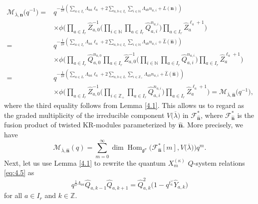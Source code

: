 \documentclass[10pt,a4paper]{amsart}
\numberwithin{equation}{section}
\DeclareMathOperator{\Hom}{Hom}
\begin{document}
\begin{align*}
\mathcal{M}_{\overline{\lambda},\mathbf{n}}\bigl(q^{-1}\bigr)
={}&q^{-\frac{1}{2\delta}(\sum_{a\in I_r}\Lambda_{aa}\ell_a+2\sum_{a,b\in I_r}\sum_{i\in\mathbb{N}}\Lambda_{ab}n_{a,i}+L( \mathbf{n}))}\\
&\times\phi\biggl(\prod_{a\in I_r}\widehat{Z}_{ a,0} ^{-1}\biggl(\prod_{i\in\mathbb{N}}\prod_{a\in I_r}\widehat{Q}_{ a,i}^{n_{a,i}}\biggr)\prod_{a\in I_r}\widehat{Z}_a^{\ell_a+1}\biggr)\\
={}&q^{-\frac{1}{2\delta}(\sum_{a\in I_r}\Lambda_{aa}\ell_a+2\sum_{a,b\in I_r}\sum_{i\in\mathbb{N}}\Lambda_{ab}n_{a,i}+\widehat{L}(\widehat{\mathbf{n}}))}\\
&\times\phi\biggl(\prod_{a\in I_r}\widehat{Q}_{a,0}^{n_{a,0}}\prod_{a\in I_r}\widehat{Z}_{ a,0} ^{-1}\biggl(\prod_{i\in\mathbb{N}}\prod_{a\in I_r} \widehat{Q}_{a,i}^{n_{a,i}}\biggr)\prod_{a\in I_r}\widehat{ Z}_a^{\ell_a+1}\biggr)\\
={}&q^{-\frac{1}{2\delta}(\sum_{a\in I_r}\Lambda_{aa}\ell_a+2\sum_{a,b\in I_r}\sum_{i\in\mathbb{Z}_+}\Lambda_{ab}n_{a,i}+\widehat{L}(\widehat{\mathbf{n}}))}\\
&\times\phi\biggl(\prod_{a\in I_r}\widehat{Z}_{a,0}^{-1}\biggl(\prod_{i\in\mathbb{Z}_+}\prod_{a\in I_r} \widehat{Q}_{a,i}^{n_{a,i}}\biggr)\prod_{a\in I_r}\widehat{ Z}_a^{\ell_a+1}\biggr)
=\mathcal{M}_{\overline{\lambda},\widehat{\mathbf{n}}}\bigl(q^{-1}\bigr),
\end{align*}
where the third equality follows from Lemma \ref{4.1}. This allows us to regard  as the graded multiplicity of the irreducible component $V\bigl(\overline{\lambda}\bigr)$ in $\mathcal{F}_{\widehat{\mathbf{n}}}^*$, where $\mathcal{F}_{\widehat{\mathbf{n}}}^*$ is the fusion product of twisted KR-modules parameterized by $\widehat{\mathbf{n}}$. More precisely, we have
\begin{equation*}
\mathcal{M}_{\overline{\lambda},\widehat{\mathbf{n}}}(q)
=\sum_{m=0}^{\infty}\dim\Hom_{\mathfrak{g}^{\sigma}}\bigl(\mathcal{ F}_{\widehat{\mathbf{n}}}^*[m],V\bigl(\overline{\lambda}\bigr)\bigr)q^m.
\end{equation*}
Next, let us use Lemma \ref{4.1} to rewrite the quantum $X_m^{(\kappa)}$ $Q$-system relations \eqref{eq:4.5} as
\begin{equation}\label{eq:5.4}
q^{\frac{1}{\delta}\Lambda_{aa}}\widehat{Q}_{a,k-1} \widehat{Q}_{a,k+1}= \widehat{Q}_{a,k}^2\bigl(1-q^{t_a^{\vee}}\widehat{Y}_{a,k}\bigr)
\end{equation}
for all $a\in I_r$ and $k\in\mathbb{Z}$.
\end{document}

